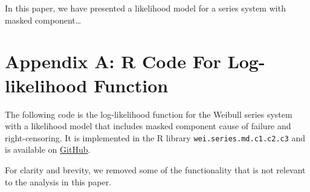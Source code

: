 \documentclass[
]{article}
\begin{document}
In this paper, we have presented a likelihood model for a series system
with masked component\ldots{}

\hypertarget{appendix-a-r-code-for-log-likelihood-function}{%
\section*{Appendix A: R Code For Log-likelihood
Function}\label{appendix-a-r-code-for-log-likelihood-function}}

\label{app:loglike-code}

The following code is the log-likelihood function for the Weibull series
system with a likelihood model that includes masked component cause of
failure and right-censoring. It is implemented in the R library
\texttt{wei.series.md.c1.c2.c3} and is available on
\href{https://github.com/queelius/wei.series.md.c1.c2.c3}{GitHub}.

For clarity and brevity, we removed some of the functionality that is
not relevant to the analysis in this paper.
\end{document}
